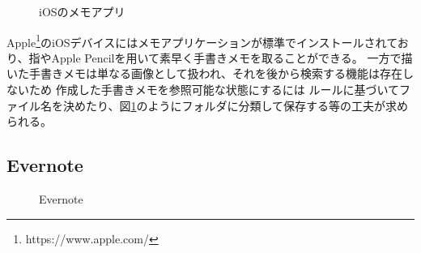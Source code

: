 \begin{figure}[htbp]
    \begin{center}
         \end{center}
    \caption{iOSのメモアプリ} \label{fig:iosmemo}
\end{figure}

Apple\footnote{https://www.apple.com/}のiOSデバイスにはメモアプリケーションが標準でインストールされており、指やApple Pencilを用いて素早く手書きメモを取ることができる。
一方で描いた手書きメモは単なる画像として扱われ、それを後から検索する機能は存在しないため 作成した手書きメモを参照可能な状態にするには
ルールに基づいてファイル名を決めたり、図\ref{fig:iosmemo}のようにフォルダに分類して保存する等の工夫が求められる。

\subsection{Evernote}

\begin{figure}[htbp]
    \begin{center}
         \end{center}
    \caption{Evernote} \label{evernote} \label{fig:evernote}
\end{figure}

